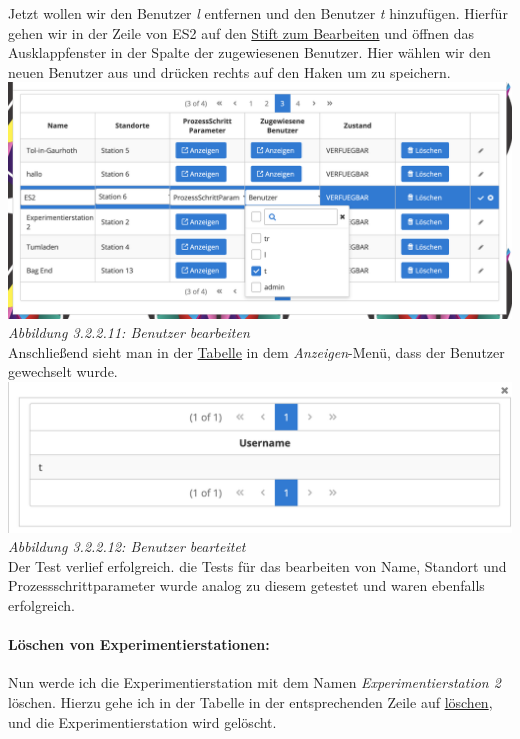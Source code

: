 \documentclass[enabledeprecatedfontcommands,fontsize=12pt,paper=a4,twoside]{scrartcl}
\begin{document}
Jetzt wollen wir den Benutzer \textit{l} entfernen und den Benutzer \textit{t} hinzufügen. Hierfür gehen wir in der Zeile von ES2 auf den  \hyperlink{sc3.1.3.11}{Stift zum Bearbeiten} und öffnen das Ausklappfenster in der Spalte der zugewiesenen Benutzer. Hier wählen wir den neuen Benutzer aus und drücken rechts auf den Haken um zu speichern. \\

\hypertarget{sc3.1.3.11}{
\includegraphics[width=1\textwidth]{Screenshots/31311.png}
\textit{Abbildung 3.2.2.11: Benutzer bearbeiten}
} \\

Anschließend sieht man in der \hyperlink{sc3.1.3.12}{Tabelle} in dem \textit{Anzeigen}-Menü, dass der Benutzer gewechselt wurde.\\

\hypertarget{sc3.1.3.12}{
\includegraphics[width=1\textwidth]{Screenshots/31312.png}
\textit{Abbildung 3.2.2.12: Benutzer bearteitet}
} \\

Der Test verlief erfolgreich. die Tests für das bearbeiten von Name, Standort und Prozessschrittparameter wurde analog zu diesem getestet und waren ebenfalls erfolgreich.

\paragraph{Löschen von Experimentierstationen:}


Nun werde ich die Experimentierstation mit dem Namen \textit{Experimentierstation 2} löschen. Hierzu gehe ich in der Tabelle in der entsprechenden Zeile auf  \hyperlink{sc3.1.3.13}{löschen}, und die Experimentierstation wird gelöscht.\\
\end{document}
